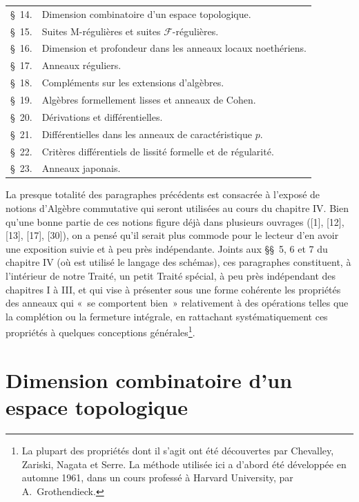 \documentclass[10pt,oneside]{book}
\begin{document}

\begin{center}
\begin{tabular}{@{}r l@{}}
\S~14. & Dimension combinatoire d'un espace topologique.\\
\S~15. & Suites M-régulières et suites $\mathscr F$-régulières.\\
\S~16. & Dimension et profondeur dans les anneaux locaux noethériens.\\
\S~17. & Anneaux réguliers.\\
\S~18. & Compléments sur les extensions d'algèbres.\\
\S~19. & Algèbres formellement lisses et anneaux de Cohen.\\
\S~20. & Dérivations et différentielles.\\
\S~21. & Différentielles dans les anneaux de caractéristique $p$.\\
\S~22. & Critères différentiels de lissité formelle et de régularité.\\
\S~23. & Anneaux japonais.
\end{tabular}
\end{center}

La presque totalité des paragraphes précédents est consacrée à l'exposé de
notions d'Algèbre commutative qui seront utilisées au cours du chapitre IV.
Bien qu'une bonne partie de ces notions figure déjà dans plusieurs ouvrages
([1], [12], [13], [17], [30]), on a pensé qu'il serait plus commode pour le
lecteur d'en avoir une exposition suivie et à peu près indépendante. Joints
aux \S\S~5, 6 et 7 du chapitre IV (où est utilisé le langage des schémas), ces
paragraphes constituent, à l'intérieur de notre Traité, un petit Traité
spécial, à peu près indépendant des chapitres I à III, et qui vise à présenter
sous une forme cohérente les propriétés des anneaux qui «~se comportent bien~»
relativement à des opérations telles que la complétion ou la fermeture
intégrale, en rattachant systématiquement ces propriétés à quelques
conceptions générales\footnote{La plupart des propriétés dont il s'agit ont
été découvertes par Chevalley, Zariski, Nagata et Serre. La méthode utilisée
ici a d'abord été développée en automne 1961, dans un cours professé à Harvard
University, par A.~Grothendieck.}.

\setcounter{section}{13}
\section{Dimension combinatoire d'un espace topologique}
\label{section:0.14-fr}
\end{document}
